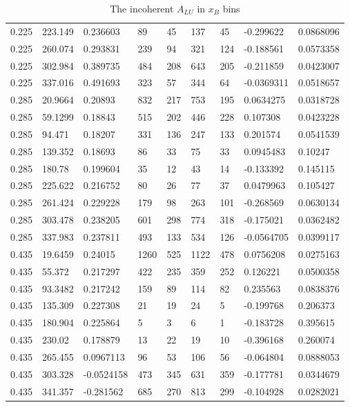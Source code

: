 \documentclass[12pt]{article}
\begin{document}
\begin{table}[!h]
\begin{center}
\begin{tabular}{||l|l|l|l|l|l|l|l|l||}
0.225    &223.149    &0.236603    &89    &45   &137   &45    &-0.299622    &0.0868096\\
0.225    &260.074    &0.293831    &239    &94   &321   &124    &-0.188561    &0.0573358\\
0.225    &302.984    &0.389735    &484    &208   &643   &205    &-0.211859    &0.0423007\\
0.225    &337.016    &0.491693    &323    &57   &344   &64    &-0.0369311    &0.0518657\\
\hline
0.285    &20.9664    &0.20893    &832    &217   &753   &195    &0.0634275    &0.0318728\\
0.285    &59.1299    &0.18843    &515    &202   &446   &228    &0.107308    &0.0423228\\
0.285    &94.471    &0.18207    &331    &136   &247   &133    &0.201574    &0.0541539\\
0.285    &139.352    &0.18693    &86    &33   &75   &33    &0.0945483    &0.10247\\
0.285    &180.78    &0.199604    &35    &12   &43   &14    &-0.133392    &0.145115\\
0.285    &225.622    &0.216752    &80    &26   &77   &37    &0.0479963    &0.105427\\
0.285    &261.424    &0.229228    &179    &98   &263   &101    &-0.268569    &0.0630134\\
0.285    &303.478    &0.238205    &601    &298   &774   &318    &-0.175021    &0.0362482\\
0.285    &337.983    &0.237811    &493    &133   &534   &126    &-0.0564705    &0.0399117\\
\hline
0.435    &19.6459    &0.24015    &1260    &525   &1122   &478    &0.0756208    &0.0275163\\
0.435    &55.372    &0.217297    &422    &235   &359   &252    &0.126221    &0.0500358\\
0.435    &93.3482    &0.217242    &159    &89   &114   &82    &0.235563    &0.0838376\\
0.435    &135.309    &0.227308    &21    &19   &24   &5    &-0.199768    &0.206373\\
0.435    &180.904    &0.225864    &5    &3   &6   &1    &-0.183728    &0.395615\\
0.435    &230.02    &0.178879    &13    &22   &19   &10    &-0.396168    &0.260074\\
0.435    &265.455    &0.0967113    &96    &53   &106   &56    &-0.064804    &0.0888053\\
0.435    &303.328    &-0.0524158    &473    &345   &631   &359    &-0.177781    &0.0344679\\
0.435    &341.357    &-0.281562    &685    &270   &813   &299    &-0.104928    &0.0282021\\       
         
         
         \hline
 \hline
 \end{tabular}
 \caption{The incoherent $A_{LU}$ in $x_B$ bins}
 \label{table:InCoh_xB_BSA}
 \end{center}
\end{table}
\end{document}
